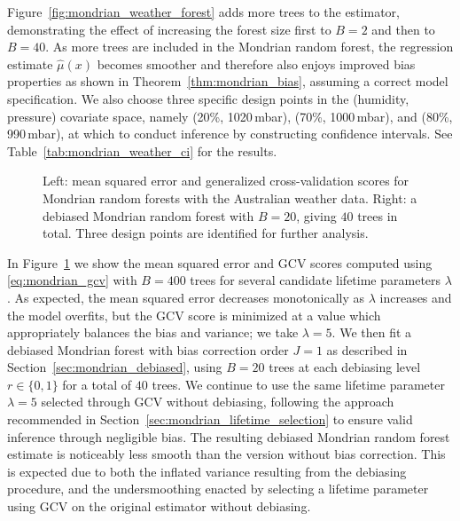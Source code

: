 \documentclass[11pt,lof]{puthesis}
\theoremstyle{break}
\theoremstyle{proof}
\begin{document}
Figure~\ref{fig:mondrian_weather_forest} adds more trees to the estimator,
demonstrating the effect of increasing the forest size first to $B=2$
and then to $B=40$.
As more trees are included in the Mondrian random forest,
the regression estimate $\hat \mu(x)$ becomes smoother and therefore also
enjoys improved bias properties as shown in
Theorem~\ref{thm:mondrian_bias}, assuming a correct model specification.
We also choose three specific design points in the
(humidity, pressure) covariate space,
namely (20\%, 1020\,mbar), (70\%, 1000\,mbar), and (80\%, 990\,mbar),
at which to conduct inference
by constructing confidence intervals. See Table~\ref{tab:mondrian_weather_ci}
for the results.

\begin{figure}[b!]
\centering
\begin{subfigure}{0.49\textwidth}
\centering
\end{subfigure}
\begin{subfigure}{0.49\textwidth}
\centering
\end{subfigure}
\caption[Cross-validation and debiasing for the Australian weather data]{
Left: mean squared error and generalized cross-validation scores
for Mondrian random forests with the Australian weather data.
Right: a debiased Mondrian random forest with $B=20$, giving $40$ trees
in total. Three design points are identified for further analysis.}
\label{fig:mondrian_weather_gcv}
\end{figure}

In Figure~\ref{fig:mondrian_weather_gcv} we show the mean squared error and GCV
scores
computed using \eqref{eq:mondrian_gcv} with $B=400$ trees
for several candidate lifetime parameters $\lambda$. As
expected, the mean squared error decreases monotonically
as $\lambda$ increases and the model
overfits, but the GCV score is minimized at a value which appropriately
balances the bias and variance; we take $\lambda = 5$.
We then fit a debiased Mondrian forest
with bias correction order $J = 1$ as described in
Section~\ref{sec:mondrian_debiased}, using $B=20$ trees at each debiasing level
$r \in \{0, 1\}$ for a total of $40$ trees.
We continue to use the same lifetime parameter
$\lambda = 5$ selected through GCV without debiasing, following the approach
recommended in Section~\ref{sec:mondrian_lifetime_selection} to ensure valid
inference
through negligible bias.
The resulting debiased Mondrian random forest estimate is noticeably
less smooth than the version without bias correction.
This is expected due to both the inflated variance resulting from the debiasing
procedure, and the undersmoothing enacted by selecting a lifetime parameter
using GCV on the original estimator without debiasing.
\end{document}
